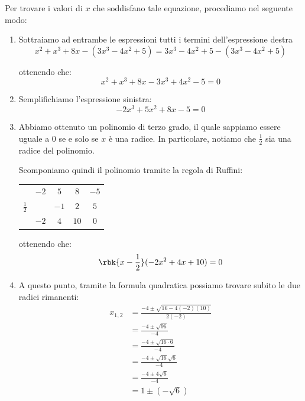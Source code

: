 \documentclass[a4paper, 12pt]{report}
\begin{document}
    Per trovare i valori di $x$ che soddisfano tale equazione, procediamo nel seguente modo:
    \begin{enumerate}
        \item Sottraiamo ad entrambe le espressioni tutti i termini dell'espressione destra 
        \[x^2+x^3+8x - (3x^3-4x^2+5) = 3x^3-4x^2+5 - (3x^3-4x^2+5)\]

        ottenendo che:
        \[x^2+x^3+8x - 3x^3+4x^2-5 = 0\]

        \item Semplifichiamo l'espressione sinistra:
        \[-2x^3 + 5x^2+8x-5 = 0\]

        \item Abbiamo ottenuto un polinomio di terzo grado, il quale sappiamo essere uguale a 0 se e solo se $x$ è una radice. In particolare, notiamo che $\frac{1}{2}$ sia una radice del polinomio.
        
        Scomponiamo quindi il polinomio tramite la regola di Ruffini:
        
        \begin{center}
            \begin{tabular}{c | c c c | c}
                 & $-2$ & $5$ & $8$ & $-5$\\
            $\frac{1}{2}$ &       & $-1$ & $2$ & $5$\\
            \hline
                & $-2$ & $4$ & $10$ & $0$ \\
            \end{tabular}
        \end{center}

        ottenendo che:
        \[\rbk{x-\frac{1}{2}}(-2x^2+4x+10) = 0\]

        \item A questo punto, tramite la formula quadratica possiamo trovare subito le due radici rimanenti:
        \[\begin{split}
            x_{1,2} &= \frac{-4 \pm \sqrt{16-4(-2)(10)}}{2(-2)} \\
            &= \frac{-4 \pm \sqrt{96}}{-4} \\
            &= \frac{-4 \pm \sqrt{16 \cdot 6}}{-4} \\
            &= \frac{-4 \pm \sqrt{16} \sqrt{6}}{-4} \\
            &= \frac{-4 \pm 4 \sqrt{6}}{-4} \\
            &= 1 \pm (-\sqrt{6})
        \end{split}\]


\end{enumerate}
\end{document}
